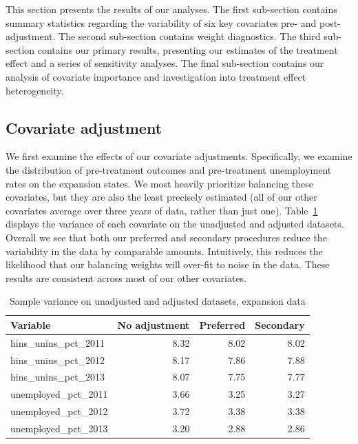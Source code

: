 \documentclass[aoas]{imsart}
\theoremstyle{plain}
\theoremstyle{remark}
\begin{document}
This section presents the results of our analyses. The first sub-section contains summary statistics regarding the variability of six key covariates pre- and post- adjustment. The second sub-section contains weight diagnostics. The third sub-section contains our primary results, presenting our estimates of the treatment effect and a series of sensitivity analyses. The final sub-section contains our analysis of covariate importance and investigation into treatment effect heterogeneity.

\subsection{Covariate adjustment}

We first examine the effects of our covariate adjustments. Specifically, we examine the distribution of pre-treatment outcomes and pre-treatment unemployment rates on the expansion states. We most heavily prioritize balancing these covariates, but they are also the least precisely estimated (all of our other covariates average over three years of data, rather than just one). Table~\ref{tab:adjust1} displays the variance of each covariate on the unadjusted and adjusted datasets. Overall we see that both our preferred and secondary procedures reduce the variability in the data by comparable amounts. Intuitively, this reduces the likelihood that our balancing weights will over-fit to noise in the data. These results are consistent across most of our other covariates.

\begin{table}[ht]
\caption{Sample variance on unadjusted and adjusted datasets, expansion data}
\label{tab:adjust1}
\begin{tabular}{lrrr}
  \hline
Variable & No adjustment & Preferred & Secondary \\ 
  \hline
  hins\_unins\_pct\_2011 & 8.32 & 8.02 & 8.02 \\ 
  hins\_unins\_pct\_2012 & 8.17 & 7.86 & 7.88 \\ 
  hins\_unins\_pct\_2013 & 8.07 & 7.75 & 7.77 \\ 
  unemployed\_pct\_2011 & 3.66 & 3.25 & 3.27 \\ 
  unemployed\_pct\_2012 & 3.72 & 3.38 & 3.38 \\ 
  unemployed\_pct\_2013 & 3.20 & 2.88 & 2.86 \\ 
   \hline
\end{tabular}
\end{table}
\end{document}
